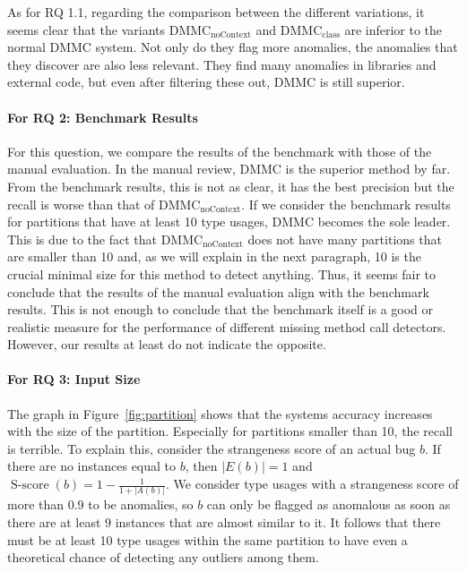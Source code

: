 As for RQ 1.1, regarding the comparison between the different variations, it seems clear that the variants $\text{DMMC}_\text{noContext}$ and $\text{DMMC}_\text{class}$ are inferior to the normal $\text{DMMC}$ system.
Not only do they flag more anomalies, the anomalies that they discover are also less relevant.
They find many anomalies in libraries and external code, but even after filtering these out, $\text{DMMC}$ is still superior.

\paragraph{For RQ 2: Benchmark Results}

For this question, we compare the results of the benchmark with those of the manual evaluation.
In the manual review, $\text{DMMC}$ is the superior method by far.
From the benchmark results, this is not as clear, it has the best precision but the recall is worse than that of $\text{DMMC}_\text{noContext}$.
If we consider the benchmark results for partitions that have at least 10 type usages, $\text{DMMC}$ becomes the sole leader.
This is due to the fact that $\text{DMMC}_\text{noContext}$ does not have many partitions that are smaller than 10 and, as we will explain in the next paragraph, 10 is the crucial minimal size for this method to detect anything.
Thus, it seems fair to conclude that the results of the manual evaluation align with the benchmark results.
This is not enough to conclude that the benchmark itself is a good or realistic measure for the performance of different missing method call detectors.
However, our results at least do not indicate the opposite.

\paragraph{For RQ 3: Input Size}

The graph in Figure~\ref{fig:partition} shows that the systems accuracy increases with the size of the partition.
Especially for partitions smaller than 10, the recall is terrible.
To explain this, consider the strangeness score of an actual bug $b$.
If there are no instances equal to $b$, then $|E(b)|=1$ and $\operatorname{S-score}(b)=1-\frac{1}{1+|A(b)|}$.
We consider type usages with a strangeness score of more than $0.9$ to be anomalies, so $b$ can only be flagged as anomalous as soon as there are at least $9$ instances that are almost similar to it.
It follows that there must be at least 10 type usages within the same partition to have even a theoretical chance of detecting any outliers among them.


